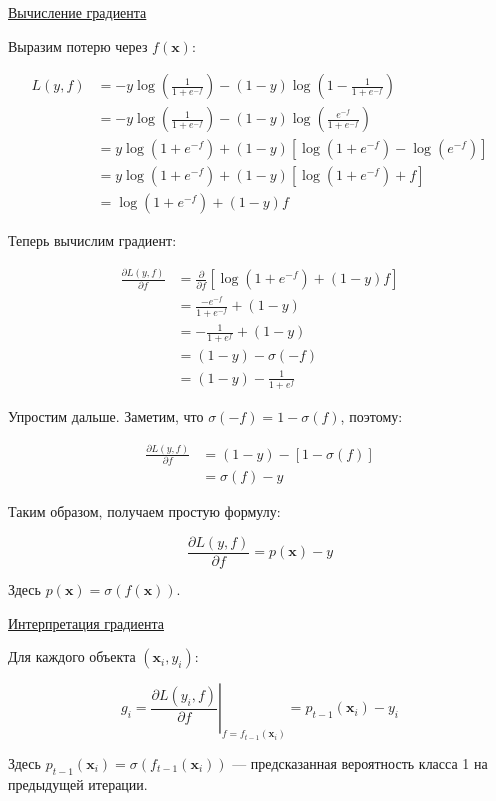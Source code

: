 \underline{Вычисление градиента}

Выразим потерю через $f(\bm{x})$:

\begin{align*}
    L(y, f) &= -y \log\left(\frac{1}{1 + e^{-f}}\right) - (1-y) \log\left(1 - \frac{1}{1 + e^{-f}}\right) \\
    &= -y \log\left(\frac{1}{1 + e^{-f}}\right) - (1-y) \log\left(\frac{e^{-f}}{1 + e^{-f}}\right) \\
    &= y \log(1 + e^{-f}) + (1-y) \left[\log(1 + e^{-f}) - \log(e^{-f})\right] \\
    &= y \log(1 + e^{-f}) + (1-y) \left[\log(1 + e^{-f}) + f\right] \\
    &= \log(1 + e^{-f}) + (1-y)f
\end{align*}

Теперь вычислим градиент:

\begin{align*}
    \frac{\partial L(y, f)}{\partial f} &= \frac{\partial}{\partial f} \left[ \log(1 + e^{-f}) + (1-y)f \right] \\
    &= \frac{-e^{-f}}{1 + e^{-f}} + (1-y) \\
    &= -\frac{1}{1 + e^{f}} + (1-y) \\
    &= (1-y) - \sigma(-f) \\
    &= (1-y) - \frac{1}{1 + e^{f}}
\end{align*}

Упростим дальше.
Заметим, что $\sigma(-f) = 1 - \sigma(f)$, поэтому:

\begin{align*}
    \frac{\partial L(y, f)}{\partial f} &= (1-y) - [1 - \sigma(f)] \\
    &= \sigma(f) - y
\end{align*}

Таким образом, получаем простую формулу:

\[ \boxed{\frac{\partial L(y, f)}{\partial f} = p(\bm{x}) - y} \]

Здесь $p(\bm{x}) = \sigma(f(\bm{x}))$.

\underline{Интерпретация градиента}

Для каждого объекта $(\bm{x}_i, y_i)$:

\[ g_i = \left. \frac{\partial L(y_i, f)}{\partial f} \right|_{f = f_{t-1}(\bm{x}_i)} = p_{t-1}(\bm{x}_i) - y_i \]

Здесь $p_{t-1}(\bm{x}_i) = \sigma(f_{t-1}(\bm{x}_i))$ --- предсказанная вероятность класса 1 на предыдущей итерации.

